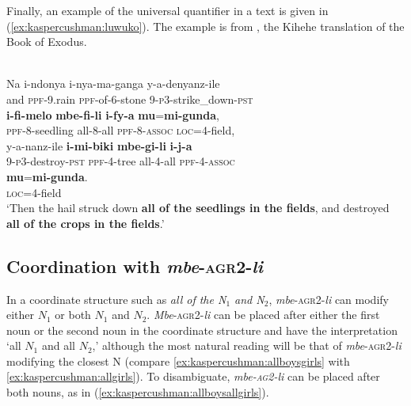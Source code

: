 \documentclass[output=paper,modfonts,nonflat]{langsci/langscibook}
\begin{document}
Finally, an example of the universal quantifier in a text is given in (\ref{ex:kaspercushman:luwuko}). The example is from \citet[9:25]{Luwuko2011}, the Kihehe translation of the Book of Exodus.

\begin{exe} 

\ex {}\label{ex:kaspercushman:luwuko}\\
\gll Na i-ndonya i-nya-ma-ganga y-a-denyanz-ile \\ 
and \textsc{ppf}-9.rain \textsc{ppf}-of-6-stone 9-\textsc{p3}-strike\_down-\textsc{pst}\\


\gll \textbf{i-fi-melo} \textbf{mbe-fi-li} \textbf{i-fy-a} \textbf{mu}=\textbf{mi-gunda}, \\
\textsc{ppf}-8-seedling all-8-all \textsc{ppf}-8-\textsc{assoc} \textsc{loc}=4-field,\\


\gll y-a-nanz-ile \textbf{i-mi-biki} \textbf{mbe-gi-li} \textbf{i-j-a}  \\
9-\textsc{p3}-destroy-\textsc{pst} \textsc{ppf}-4-tree all-4-all \textsc{ppf}-4-\textsc{assoc}  \\


\gll \textbf{mu}=\textbf{mi-gunda}. \\ 
\textsc{loc}=4-field \\

\glt `Then the hail struck down \textbf{all of the seedlings in the fields}, and destroyed \textbf{all of the crops in the fields}.' \\
\end{exe}

\subsection{Coordination with \emph{mbe}-\textsc{agr2}-\emph{li}}

In a coordinate structure such as \textit{all of the N$_{1}$ and N$_{2}$}, \emph{mbe}-\textsc{agr2}-\emph{li}  can modify either $N_{1}$ or both $N_{1}$ and $N_{2}$.  \emph{Mbe}-\textsc{agr2}-\emph{li} can be placed after either the first noun or the second noun in the coordinate structure and have the interpretation `all $N_{1}$ and all $N_{2}$,' although the most natural reading will be that of \emph{mbe}-\textsc{agr2}-\emph{li} modifying the closest N (compare \ref{ex:kaspercushman:allboysgirls} with \ref{ex:kaspercushman:allgirls}). To disambiguate, \emph{mbe-\textsc{ag2}-li} can be placed after both nouns, as in (\ref{ex:kaspercushman:allboysallgirls}).
\end{document}
